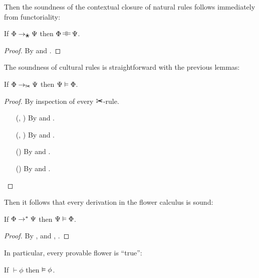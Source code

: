 Then the soundness of the contextual closure of natural rules follows
immediately from functoriality:

\begin{lemma}
  If $\Phi \step_{\Nature} \Psi$ then $\Phi \kequiv \Psi$.
\end{lemma}
\begin{proof}
  By  and .
\end{proof}

The soundness of cultural rules is straightforward with the previous lemmas:

\begin{lemma}
  If $\Phi \step_{\Culture} \Psi$ then $\Psi \vDash \Phi$.
\end{lemma}
\begin{proof}
  By inspection of every $\Culture$-rule.
  \begin{itemize}
    \item[(\rsf{grow}, \rsf{crop})] By  and
    .
    
    \item[(\rsf{pull}, \rsf{glue})] By  and
    .
    
    \item[(\rsf{apis})] By  and .

    \item[(\rsf{apet})] By  and .
  \end{itemize}
\end{proof}

Then it follows that every derivation in the flower calculus is sound:

\begin{lemma}
  If $\Phi \rightarrow^\ast \Psi$ then $\Psi \vDash \Phi$.
\end{lemma}
\begin{proof}
  By , 
  and , .
\end{proof}

In particular, every provable flower is ``true'':

\begin{theorem}[Soundness]
  If $\vdash \phi$ then $\vDash \phi$.
\end{theorem}

